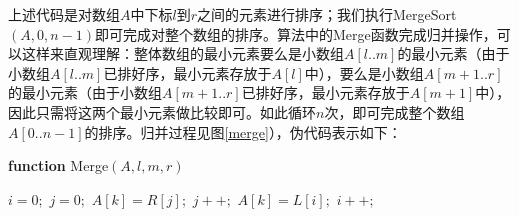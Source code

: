 上述代码是对数组$A$中下标$l$到$r$之间的元素进行排序；我们执行{\sc MergeSort}$(A, 0, n-1)$即可完成对整个数组的排序。算法中的{\sc Merge}函数完成归并操作，可以这样来直观理解：整体数组的最小元素要么是小数组$A[l..m]$的最小元素（由于小数组$A[l..m]$已排好序，最小元素存放于$A[l]$中），要么是小数组$A[m+1..r]$的最小元素（由于小数组$A[m+1..r]$已排好序，最小元素存放于$A[m+1]$中），因此只需将这两个最小元素做比较即可。如此循环$n$次，即可完成整个数组$A[0..n-1]$的排序。归并过程见图\ref{merge}），伪代码表示如下：


\begin{algorithm}[H]
\caption{Merge presorted $A[l..m]$ (denoted as $L$) and $A[m+1..r]$  (denoted as $R$)} \label{MergeAlgo} 
{\bf function} {\sc Merge}$(A, l, m, r )$
\begin{algorithmic}[1]
\STATE $i=0;$ $j=0;$
		\STATE $A[k] = R[j];$
		\STATE $j++;$
	\ELSE
		\STATE $A[k] = L[i];$
		\STATE $i++;$
	\ENDIF
\ENDFOR
\end{algorithmic}
\end{algorithm}



